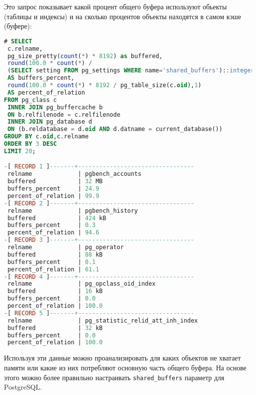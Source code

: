 Это запрос показывает какой процент общего буфера используют обьекты (таблицы и индексы) и на сколько процентов объекты находятся в самом кэше (буфере):

\begin{lstlisting}[language=SQL,label=lst:pgbuffercache4,caption=pg\_buffercache]
# SELECT
 c.relname,
 pg_size_pretty(count(*) * 8192) as buffered,
 round(100.0 * count(*) /
 (SELECT setting FROM pg_settings WHERE name='shared_buffers')::integer,1)
 AS buffers_percent,
 round(100.0 * count(*) * 8192 / pg_table_size(c.oid),1)
 AS percent_of_relation
FROM pg_class c
 INNER JOIN pg_buffercache b
 ON b.relfilenode = c.relfilenode
 INNER JOIN pg_database d
 ON (b.reldatabase = d.oid AND d.datname = current_database())
GROUP BY c.oid,c.relname
ORDER BY 3 DESC
LIMIT 20;

-[ RECORD 1 ]-------+---------------------------------
 relname             | pgbench_accounts
 buffered            | 32 MB
 buffers_percent     | 24.9
 percent_of_relation | 99.9
-[ RECORD 2 ]-------+---------------------------------
 relname             | pgbench_history
 buffered            | 424 kB
 buffers_percent     | 0.3
 percent_of_relation | 94.6
-[ RECORD 3 ]-------+---------------------------------
 relname             | pg_operator
 buffered            | 88 kB
 buffers_percent     | 0.1
 percent_of_relation | 61.1
-[ RECORD 4 ]-------+---------------------------------
 relname             | pg_opclass_oid_index
 buffered            | 16 kB
 buffers_percent     | 0.0
 percent_of_relation | 100.0
-[ RECORD 5 ]-------+---------------------------------
 relname             | pg_statistic_relid_att_inh_index
 buffered            | 32 kB
 buffers_percent     | 0.0
 percent_of_relation | 100.0
\end{lstlisting}

Используя эти данные можно проанализировать для каких объектов не хватает памяти или какие из них потребляют основную часть общего буфера. На основе этого можно более правильно настраивать \lstinline!shared_buffers! параметр для PostgreSQL.

